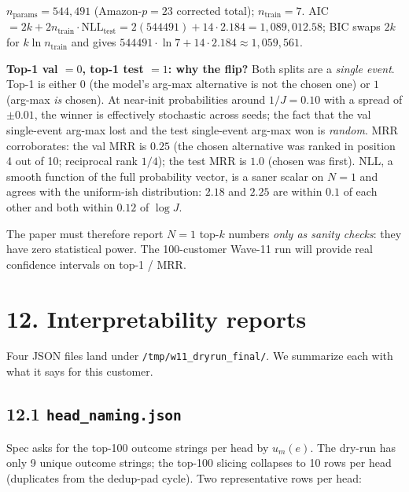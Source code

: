 \documentclass[11pt,a4paper]{article}
\begin{document}
$n_{\text{params}} = 544{,}491$ (Amazon-$p = 23$ corrected total);
$n_{\text{train}} = 7$. AIC $= 2k + 2 n_{\text{train}} \cdot
\text{NLL}_{\text{test}} = 2 (544491) + 14 \cdot 2.184 =
1{,}089{,}012.58$; BIC swaps $2k$ for $k \ln n_{\text{train}}$ and
gives $544491 \cdot \ln 7 + 14 \cdot 2.184 \approx 1{,}059{,}561$.

\textbf{Top-1 val $= 0$, top-1 test $= 1$: why the flip?}
Both splits are a \emph{single event}. Top-1 is either $0$ (the
model's arg-max alternative is not the chosen one) or $1$ (arg-max
\emph{is} chosen). At near-init probabilities around $1/J = 0.10$ with
a spread of $\pm 0.01$, the winner is effectively stochastic across
seeds; the fact that the val single-event arg-max lost and the test
single-event arg-max won is \emph{random}. MRR corroborates: the val
MRR is $0.25$ (the chosen alternative was ranked in position 4 out of
10; reciprocal rank $1/4$); the test MRR is $1.0$ (chosen was first).
NLL, a smooth function of the full probability vector, is a saner
scalar on $N = 1$ and agrees with the uniform-ish distribution: $2.18$
and $2.25$ are within $0.1$ of each other and both within $0.12$ of
$\log J$.

The paper must therefore report $N = 1$ top-$k$ numbers \emph{only as
sanity checks}: they have zero statistical power. The 100-customer
Wave-11 run will provide real confidence intervals on top-1 / MRR.

\section*{12. Interpretability reports}

Four JSON files land under \texttt{/tmp/w11\_dryrun\_final/}. We
summarize each with what it says for this customer.

\subsection*{12.1 \texttt{head\_naming.json}}

Spec asks for the top-100 outcome strings per head by $u_m(e)$. The
dry-run has only 9 unique outcome strings; the top-100 slicing
collapses to 10 rows per head (duplicates from the dedup-pad cycle).
Two representative rows per head:
\end{document}
